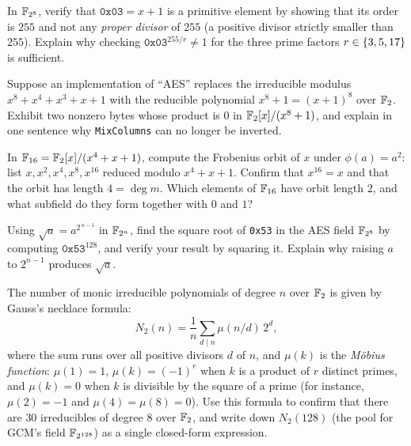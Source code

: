 \begin{exercise}
\label{ch06:ex-gensearch}
In $\mathbb{F}_{2^8}$, verify that $\texttt{0x03} = x+1$ is a primitive element by
showing that its order is $255$ and not any \emph{proper divisor} of $255$ (a
positive divisor strictly smaller than $255$). Explain why checking
$\texttt{0x03}^{255/r} \neq 1$ for the three prime factors
$r \in \{3,5,17\}$ is sufficient.
\end{exercise}

\begin{exercise}
\label{ch06:ex-break}
Suppose an implementation of ``AES'' replaces the irreducible modulus
$x^8+x^4+x^3+x+1$ with the reducible polynomial $x^8+1 = (x+1)^8$ over $\mathbb{F}_2$.
Exhibit two nonzero bytes whose product is $0$ in $\mathbb{F}_2[x]/(x^8+1)$, and
explain in one sentence why \texttt{MixColumns} can no longer be inverted.
\end{exercise}

\begin{exercise}
\label{ch06:ex-frob}
In $\mathbb{F}_{16} = \mathbb{F}_2[x]/(x^4+x+1)$, compute the Frobenius orbit of $x$ under
$\phi(a)=a^2$: list $x, x^2, x^4, x^8, x^{16}$ reduced modulo $x^4+x+1$.
Confirm that $x^{16}=x$ and that the orbit has length $4 = \deg m$. Which
elements of $\mathbb{F}_{16}$ have orbit length $2$, and what subfield do they form
together with $0$ and $1$?
\end{exercise}

\begin{exercise}
\label{ch06:ex-sqrt}
Using $\sqrt{a} = a^{2^{\,n-1}}$ in $\mathbb{F}_{2^n}$, find the square root of
\texttt{0x53} in the AES field $\mathbb{F}_{2^8}$ by computing $\texttt{0x53}^{128}$,
and verify your result by squaring it. Explain why raising $a$ to $2^{n-1}$
produces $\sqrt{a}$.
\end{exercise}

\begin{exercise}
\label{ch06:ex-count}
The number of monic irreducible polynomials of degree $n$ over $\mathbb{F}_2$ is given
by Gauss's necklace formula:
\[
N_2(n) = \frac{1}{n}\sum_{d \mid n}\mu(n/d)\,2^{d},
\]
where the sum runs over all positive divisors $d$ of $n$, and $\mu(k)$ is the
\emph{M\"obius function}: $\mu(1) = 1$, $\mu(k) = (-1)^r$ when $k$ is a product
of $r$ distinct primes, and $\mu(k) = 0$ when $k$ is divisible by the square of
a prime (for instance, $\mu(2) = -1$ and $\mu(4) = \mu(8) = 0$). Use this
formula to confirm that there are $30$ irreducibles of degree $8$ over $\mathbb{F}_2$,
and write down $N_2(128)$ (the pool for GCM's field $\mathbb{F}_{2^{128}}$) as a single
closed-form expression.
\end{exercise}
